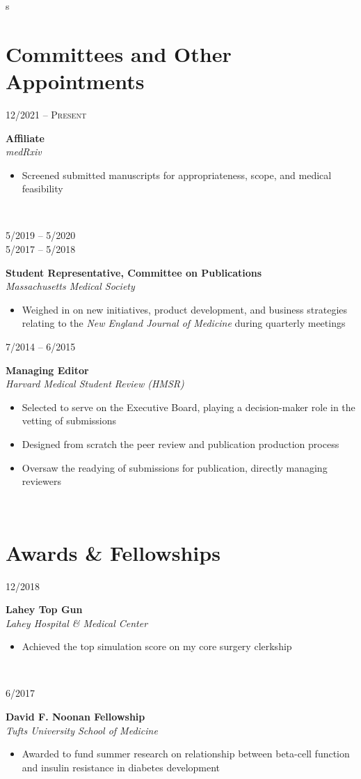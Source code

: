 s\documentclass{article}
\newcommand\colleft{.20}
\newcommand\colright{.75}
\newcommand{\entryfour}[4]
	{
		\begin{minipage}[t]{\colleft\textwidth}
		\hfill \textsc{#1}
		\end{minipage}
		\hfill\vline\hfill
		\begin{minipage}[t]{\colright\textwidth}
		{\bf#2}\\
		\textit{#3}
		\footnotesize{#4}
		\end{minipage}\\
		\entryvspace
	}%
\newcommand{\entryvspace}{\vspace{0.5em}}
\begin{document}
	\section*{Committees and Other Appointments}
		\entryfour{12/2021 -- Present}{Affiliate}{medRxiv}{%
			\begin{itemize}
				\item Screened submitted manuscripts for appropriateness, scope, and medical feasibility
		\end{itemize}
		}


\begin{minipage}[t]{\colleft\textwidth}
	\vspace{0.1pc}
	\begin{flushright}
		5/2019 -- 5/2020\\
		5/2017 -- 5/2018
	\end{flushright}
\end{minipage}
\hfill\vline\hfill
\begin{minipage}[t]{\colright\textwidth}
	{\bf Student Representative, Committee on Publications}\\
	\textit{Massachusetts Medical Society}
	\footnotesize{%
		\begin{itemize}
			\item  Weighed in on new initiatives, product development, and business strategies relating to the \emph{New England Journal of Medicine} during quarterly meetings
		\end{itemize}
	}
\end{minipage}
\entryvspace


	\entryfour{7/2014 -- 6/2015}{Managing Editor}{Harvard Medical Student Review (HMSR)}{%
	\begin{itemize}
		\item Selected to serve on the Executive Board, playing a decision-maker role in the vetting of submissions
		\item Designed from scratch the peer review and publication production process
		\item Oversaw the readying of submissions for publication, directly managing reviewers
	\end{itemize}
	}

	\section*{Awards \& Fellowships}
	\entryfour{12/2018}{Lahey Top Gun}{Lahey Hospital \& Medical Center}{%
		\begin{itemize}
			\item Achieved the top simulation score on my core surgery clerkship
			\end{itemize}
		}
	
	\entryfour{6/2017}{David F. Noonan Fellowship}{Tufts University School of Medicine}{%
		\begin{itemize}
			\item Awarded to fund summer research on relationship between beta-cell function and insulin
			resistance in diabetes development
			\end{itemize}
		}
	
\end{document}
